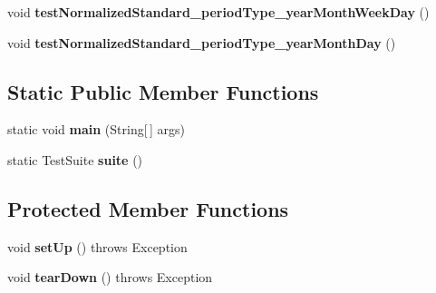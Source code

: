 \begin{DoxyCompactItemize}
\item 
\hypertarget{classorg_1_1joda_1_1time_1_1_test_period___basics_a692993381d2c484066a966638ba34e85}{void {\bfseries test\-Normalized\-Standard\-\_\-period\-Type\-\_\-year\-Month\-Week\-Day} ()}\label{classorg_1_1joda_1_1time_1_1_test_period___basics_a692993381d2c484066a966638ba34e85}

\item 
\hypertarget{classorg_1_1joda_1_1time_1_1_test_period___basics_aa6814cdf69bd20f21bce89c15867c81b}{void {\bfseries test\-Normalized\-Standard\-\_\-period\-Type\-\_\-year\-Month\-Day} ()}\label{classorg_1_1joda_1_1time_1_1_test_period___basics_aa6814cdf69bd20f21bce89c15867c81b}

\end{DoxyCompactItemize}
\subsection*{Static Public Member Functions}
\begin{DoxyCompactItemize}
\item 
\hypertarget{classorg_1_1joda_1_1time_1_1_test_period___basics_a4660a8c9f7183842c35139c976bfa1e6}{static void {\bfseries main} (String\mbox{[}$\,$\mbox{]} args)}\label{classorg_1_1joda_1_1time_1_1_test_period___basics_a4660a8c9f7183842c35139c976bfa1e6}

\item 
\hypertarget{classorg_1_1joda_1_1time_1_1_test_period___basics_a97cd9ac3558767509bc4cd32053bea7e}{static Test\-Suite {\bfseries suite} ()}\label{classorg_1_1joda_1_1time_1_1_test_period___basics_a97cd9ac3558767509bc4cd32053bea7e}

\end{DoxyCompactItemize}
\subsection*{Protected Member Functions}
\begin{DoxyCompactItemize}
\item 
\hypertarget{classorg_1_1joda_1_1time_1_1_test_period___basics_a98bcdd7cd01858eb0a7fe77eab0f9622}{void {\bfseries set\-Up} ()  throws Exception }\label{classorg_1_1joda_1_1time_1_1_test_period___basics_a98bcdd7cd01858eb0a7fe77eab0f9622}

\item 
\hypertarget{classorg_1_1joda_1_1time_1_1_test_period___basics_abe222112908a9c0fc40e24234a826275}{void {\bfseries tear\-Down} ()  throws Exception }\label{classorg_1_1joda_1_1time_1_1_test_period___basics_abe222112908a9c0fc40e24234a826275}

\end{DoxyCompactItemize}


